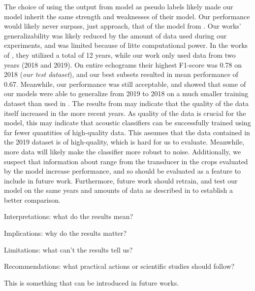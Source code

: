     The choice of using the output from \citeauthor{brautaset2020acoustic} model as pseudo labels likely made our model inherit the same strength and weaknesses of their model. Our performance would likely never surpass, just approach, that of the model from \citeauthor{brautaset2020acoustic}. Our works' generalizability was likely reduced by the amount of data used during our experiments, and was limited because of litte computational power. In the works of \citeauthor{brautaset2020acoustic}, they utilized a total of 12 years, while our work only used data from two years (2018 and 2019). On entire echograms their highest F1-score was 0.78 on 2018 (\textit{our test dataset}), and our best subsets resulted in mean performance of 0.67. Meanwhile, our performance was still acceptable, and showed that some of our models were able to generalize from 2019 to 2018 on a much smaller training dataset than used in \citeauthor{brautaset2020acoustic}. The results from \citeauthor{brautaset2020acoustic} may indicate that the quality of the data itself increased in the more recent years. As quality of the data is crucial for the model, this may indicate that acoustic classifiers can be successfully trained using far fewer quantities of high-quality data. This assumes that the data contained in the 2019 dataset is of high-quality, which is hard for us to evaluate. Meanwhile, more data will likely make the classifier more robust to noise. Additionally, we suspect that information about range from the transducer in the crops evaluated by the model increase performance, and so should be evaluated as a feature to include in future work. Furthermore, future work should retrain, and test our model on the same years and amounts of data as described in \citeauthor{brautaset2020acoustic} to establish a better comparison.  

    
    Interpretations: what do the results mean?
    
    Implications: why do the results matter?
    
    Limitations: what can’t the results tell us?
    
    Recommendations: what practical actions or scientific studies should follow?
    

     
     This is something that can be introduced in future works.

